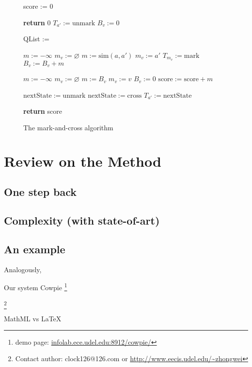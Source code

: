 \begin{figure}
\begin{algorithmic}[1]

\State score := 0

\State \textbf{return} 0 
\EndIf
{}
\State $T_{a'} := \mathrm{unmark}$ 
\EndFor
{}
\State $B_v := 0$ 
\EndFor

\State QList := 


\State $m := -\infty$
\State $m_v := \varnothing$
\State $m := \mathrm{sim}(a, a')$ 
\State $m_v := a'$ 
\EndIf
\EndFor
{}
\State $T_{m_v} := \mathrm{mark}$ 
\State $B_v := B_v + m$
\EndIf
\EndFor


\State $m := -\infty$
\State $m_v := \varnothing $
\State $m := B_v$ 
\State $m_v := v$ 
\EndIf
\State $B_v := 0$ 
\EndFor
\State $\mathrm{score} := \mathrm{score} + m$ 

\State $\mathrm{nextState} := \mathrm{unmark}$ 
\Else
\State $\mathrm{nextState} := \mathrm{cross}$ 
\EndIf
{}
\State $T_{a'} := \mathrm{nextState}$ 
\EndIf
\EndFor
\EndFor

\EndIf

\EndFor

\State \textbf{return} score
\EndProcedure

\end{algorithmic}
\caption{The mark-and-cross algorithm}\label{markcrossalgo}
\end{figure}

\section{Review on the Method}
\subsection{One step back}
\subsection{Complexity (with state-of-art)}
\subsection{An example}
\label{secIllu}

Analogously,

Our system Cowpie \footnote{demo page: \url{infolab.ece.udel.edu:8912/cowpie/}}

\let\thefootnote\relax\footnote{Contact author: clock126@126.com or
\url{http://www.eecis.udel.edu/~zhongwei}}

MathML vs LaTeX
